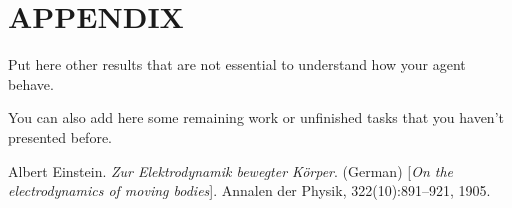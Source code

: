 \documentclass[letterpaper, 10 pt, conference]{ieeeconf}  %
\begin{document}
\section*{APPENDIX}

Put here other results that are not essential to understand how your agent behave. 

You can also add here some remaining work or unfinished tasks that you haven't presented before.

\begin{thebibliography}{}
Albert Einstein. 
\textit{Zur Elektrodynamik bewegter K{\"o}rper}. (German) 
[\textit{On the electrodynamics of moving bodies}]. 
Annalen der Physik, 322(10):891–921, 1905.
\end{thebibliography}{}
\end{document}
